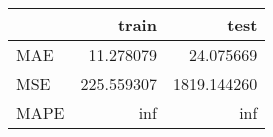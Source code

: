 \begin{tabular}{lrr}
\toprule
{} &       train &         test \\
\midrule
MAE  &   11.278079 &    24.075669 \\
MSE  &  225.559307 &  1819.144260 \\
MAPE &         inf &          inf \\
\bottomrule
\end{tabular}
